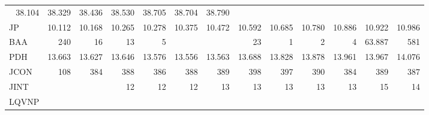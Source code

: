 \begin{tabular}{lllllllllllll}
  \multicolumn{1}{r}{38.104} &
  \multicolumn{1}{r}{38.329} &
  \multicolumn{1}{r}{38.436} &
  \multicolumn{1}{r}{38.530} &
  \multicolumn{1}{r}{38.705} &
  \multicolumn{1}{r}{38.704} &
  \multicolumn{1}{r}{38.790} \\
\multicolumn{1}{l}{\hspace{1em}JP} &
  \multicolumn{1}{|r}{10.112} &
  \multicolumn{1}{r}{10.168} &
  \multicolumn{1}{r}{10.265} &
  \multicolumn{1}{r}{10.278} &
  \multicolumn{1}{r}{10.375} &
  \multicolumn{1}{r}{10.472} &
  \multicolumn{1}{r}{10.592} &
  \multicolumn{1}{r}{10.685} &
  \multicolumn{1}{r}{10.780} &
  \multicolumn{1}{r}{10.886} &
  \multicolumn{1}{r}{10.922} &
  \multicolumn{1}{r}{10.986} \\
\multicolumn{1}{l}{\hspace{1em}BAA} &
  \multicolumn{1}{|r}{240} &
  \multicolumn{1}{r}{16} &
  \multicolumn{1}{r}{13} &
  \multicolumn{1}{r}{5} &
  \multicolumn{1}{r}{} &
  \multicolumn{1}{r}{} &
  \multicolumn{1}{r}{23} &
  \multicolumn{1}{r}{1} &
  \multicolumn{1}{r}{2} &
  \multicolumn{1}{r}{4} &
  \multicolumn{1}{r}{63.887} &
  \multicolumn{1}{r}{581} \\
\multicolumn{1}{l}{\hspace{1em}PDH} &
  \multicolumn{1}{|r}{13.663} &
  \multicolumn{1}{r}{13.627} &
  \multicolumn{1}{r}{13.646} &
  \multicolumn{1}{r}{13.576} &
  \multicolumn{1}{r}{13.556} &
  \multicolumn{1}{r}{13.563} &
  \multicolumn{1}{r}{13.688} &
  \multicolumn{1}{r}{13.828} &
  \multicolumn{1}{r}{13.878} &
  \multicolumn{1}{r}{13.961} &
  \multicolumn{1}{r}{13.967} &
  \multicolumn{1}{r}{14.076} \\
\multicolumn{1}{l}{\hspace{1em}JCON} &
  \multicolumn{1}{|r}{108} &
  \multicolumn{1}{r}{384} &
  \multicolumn{1}{r}{388} &
  \multicolumn{1}{r}{386} &
  \multicolumn{1}{r}{388} &
  \multicolumn{1}{r}{389} &
  \multicolumn{1}{r}{398} &
  \multicolumn{1}{r}{397} &
  \multicolumn{1}{r}{390} &
  \multicolumn{1}{r}{384} &
  \multicolumn{1}{r}{389} &
  \multicolumn{1}{r}{387} \\
\multicolumn{1}{l}{\hspace{1em}JINT} &
  \multicolumn{1}{|r}{} &
  \multicolumn{1}{r}{} &
  \multicolumn{1}{r}{12} &
  \multicolumn{1}{r}{12} &
  \multicolumn{1}{r}{12} &
  \multicolumn{1}{r}{13} &
  \multicolumn{1}{r}{13} &
  \multicolumn{1}{r}{13} &
  \multicolumn{1}{r}{13} &
  \multicolumn{1}{r}{13} &
  \multicolumn{1}{r}{15} &
  \multicolumn{1}{r}{14} \\
\multicolumn{1}{l}{\hspace{1em}LQVNP} &

\end{tabular}
